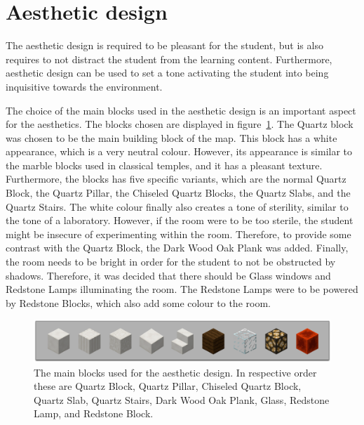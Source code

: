 \documentclass[11pt,twoside]{report} %
\begin{document}
\section{Aesthetic design}

The aesthetic design is required to be pleasant for the student, but is also requires to not distract the student from the learning content. Furthermore, aesthetic design can be used to set a tone activating the student into being inquisitive towards the environment.

The choice of the main blocks used in the aesthetic design is an important aspect for the aesthetics. The blocks chosen are displayed in figure~\ref{fig:blocks}. The Quartz block was chosen to be the main building block of the map. This block has a white appearance, which is a very neutral colour. However, its appearance is similar to the marble blocks used in classical temples, and it has a pleasant texture. Furthermore, the blocks has five specific variants, which are the normal Quartz Block, the Quartz Pillar, the Chiseled Quartz Blocks, the Quartz Slabs, and the Quartz Stairs. The white colour finally also creates a tone of sterility, similar to the tone of a laboratory. However, if the room were to be too sterile, the student might be insecure of experimenting within the room. Therefore, to provide some contrast with the Quartz Block, the Dark Wood Oak Plank was added. Finally, the room needs to be bright in order for the student to not be obstructed by shadows. Therefore, it was decided that there should be Glass windows and Redstone Lamps illuminating the room. The Redstone Lamps were to be powered by Redstone Blocks, which also add some colour to the room.

\begin{figure}[h]
\centering
\includegraphics[width=\textwidth]{blocks}
\caption{The main blocks used for the aesthetic design. In respective order these are Quartz Block, Quartz Pillar, Chiseled Quartz Block, Quartz Slab, Quartz Stairs, Dark Wood Oak Plank, Glass, Redstone Lamp, and Redstone Block. \label{fig:blocks}}
\end{figure}
\end{document}
